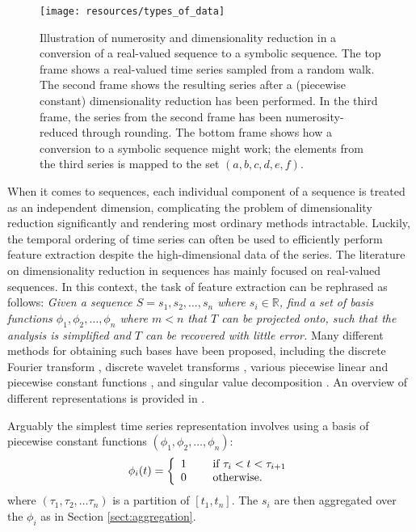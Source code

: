 \begin{figure}[htb]
  \begin{center}
    \leavevmode
    \texttt{[image: resources/types\_of\_data]}
  \end{center}
  \caption{\small{Illustration of numerosity and dimensionality reduction in a conversion of a real-valued sequence to a symbolic sequence. The top frame shows a real-valued time series sampled from a random walk. The second frame shows the resulting series after a (piecewise constant) dimensionality reduction has been performed. In the third frame, the series from the second frame has been numerosity-reduced through rounding. The bottom frame shows how a conversion to a symbolic sequence might work; the elements from the third series is mapped to the set $(a,b,c,d,e,f)$.}}
  \label{fig:types_of_data}
\end{figure}

When it comes to sequences, each individual component of a sequence is treated as an independent dimension, complicating the problem of dimensionality reduction significantly and rendering most ordinary methods intractable. Luckily, the temporal ordering of time series can often be used to efficiently perform feature extraction despite the high-dimensional data of the series. The literature on dimensionality reduction in sequences has mainly focused on real-valued sequences. In this context, the task of feature extraction can be rephrased as follows: \emph{Given a sequence $S = s_1, s_2, \dots, s_n$ where $s_i \in \mathbb{R}$, find a set of basis functions $\phi_1, \phi_2, \dots, \phi_n$ where $m < n$ that $T$ can be projected onto, such that the analysis is simplified and $T$ can be recovered with little error.} Many different methods for obtaining such bases have been proposed, including the discrete Fourier transform \cite{faloutsos1}, discrete wavelet transforms \cite{pong}, various piecewise linear and piecewise constant functions \cite{keogh3} \cite{geurts}, and singular value decomposition \cite{keogh3}. An overview of different representations is provided in \cite{fabian}.

Arguably the simplest time series representation involves using a basis of piecewise constant functions $(\phi_1, \phi_2, \dots, \phi_n)$:
\[
  \phi_i(t) = \left\{
    \begin{array}{l l}
      1 & \quad \text{ if } \tau_i < t < \tau_{i+1} \\
      0 & \quad \text{ otherwise.} \\
    \end{array} \right.
\]
where $(\tau_1, \tau_2, \dots \tau_n)$ is a partition of $[t_1, t_n]$. The $s_i$ are then aggregated over the $\phi_i$ as in Section \ref{sect:aggregation}. 

